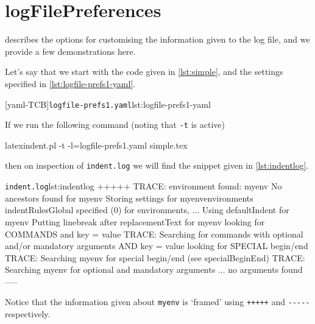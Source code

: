  \section{logFilePreferences}\label{app:logfile-demo}
   describes the options for customising the information given
  to the log file, and we provide a few demonstrations here.

  \begin{example}
  Let's say that we start with the code given in \cref{lst:simple}, and the settings
  specified in \cref{lst:logfile-prefs1-yaml}.

  \begin{minipage}{.35\linewidth}
  \end{minipage}
  \hfill
  \begin{minipage}{.6\linewidth}
   [yaml-TCB]{\texttt{logfile-prefs1.yaml}}{lst:logfile-prefs1-yaml}
  \end{minipage}

  If we run the following command (noting that \texttt{-t} is active)

  \begin{commandshell}
latexindent.pl -t -l=logfile-prefs1.yaml simple.tex
\end{commandshell}

  then on inspection of \texttt{indent.log} we will find the snippet given in
  \cref{lst:indentlog}.
  \begin{cmhlistings}[style=tcblatex,morekeywords={TRACE}]{\texttt{indent.log}}{lst:indentlog}
       +++++
TRACE: environment found: myenv
       No ancestors found for myenv
       Storing settings for myenvenvironments
       indentRulesGlobal specified (0) for environments, ...
       Using defaultIndent for myenv
       Putting linebreak after replacementText for myenv
       looking for COMMANDS and key = {value}
TRACE: Searching for commands with optional and/or mandatory arguments AND key = {value}
       looking for SPECIAL begin/end
TRACE: Searching myenv for special begin/end (see specialBeginEnd)
TRACE: Searching myenv for optional and mandatory arguments
       ... no arguments found
       -----
     \end{cmhlistings}
  Notice that the information given about \texttt{myenv} is `framed' using \texttt{+++++}
  and \lstinline!-----! respectively.
  \end{example}

